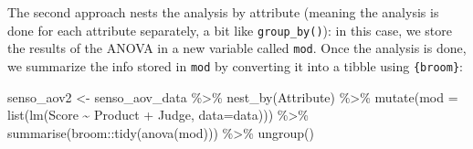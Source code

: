 \documentclass[
]{book}
\newenvironment{Shaded}{\begin{snugshade}}{\end{snugshade}}
\newcommand{\AttributeTok}[1]{\textcolor[rgb]{0.77,0.63,0.00}{#1}}
\newcommand{\ControlFlowTok}[1]{\textcolor[rgb]{0.13,0.29,0.53}{\textbf{#1}}}
\newcommand{\FunctionTok}[1]{\textcolor[rgb]{0.00,0.00,0.00}{#1}}
\newcommand{\NormalTok}[1]{#1}
\newcommand{\OtherTok}[1]{\textcolor[rgb]{0.56,0.35,0.01}{#1}}
\newcommand{\SpecialCharTok}[1]{\textcolor[rgb]{0.00,0.00,0.00}{#1}}
\newcommand{\StringTok}[1]{\textcolor[rgb]{0.31,0.60,0.02}{#1}}
\begin{document}
\begin{Shaded}
\end{Shaded}

The second approach nests the analysis by attribute (meaning the analysis is done for each attribute separately, a bit like \texttt{group\_by()}): in this case, we store the results of the ANOVA in a new variable called \texttt{mod}.
Once the analysis is done, we summarize the info stored in \texttt{mod} by converting it into a tibble using \texttt{\{broom\}}:

\begin{Shaded}
\begin{Highlighting}[]
\NormalTok{senso\_aov2 }\OtherTok{\textless{}{-}}\NormalTok{ senso\_aov\_data }\SpecialCharTok{\%\textgreater{}\%} 
  \FunctionTok{nest\_by}\NormalTok{(Attribute) }\SpecialCharTok{\%\textgreater{}\%} 
  \FunctionTok{mutate}\NormalTok{(}\AttributeTok{mod =} \FunctionTok{list}\NormalTok{(}\FunctionTok{lm}\NormalTok{(Score }\SpecialCharTok{\textasciitilde{}}\NormalTok{ Product }\SpecialCharTok{+}\NormalTok{ Judge, }\AttributeTok{data=}\NormalTok{data))) }\SpecialCharTok{\%\textgreater{}\%} 
  \FunctionTok{summarise}\NormalTok{(broom}\SpecialCharTok{::}\FunctionTok{tidy}\NormalTok{(}\FunctionTok{anova}\NormalTok{(mod))) }\SpecialCharTok{\%\textgreater{}\%} 
  \FunctionTok{ungroup}\NormalTok{()}
\end{Highlighting}
\end{Shaded}
\end{document}
